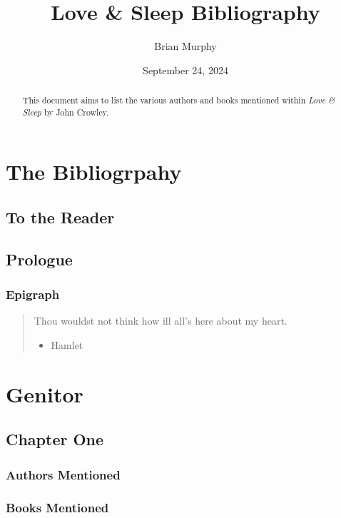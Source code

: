 \documentclass[
  11pt,
]{article}
\title{Love \& Sleep Bibliography}
\author{Brian Murphy}
\date{September 24, 2024}
\providecommand{\tightlist}{%
  \setlength{\itemsep}{0pt}\setlength{\parskip}{0pt}}
\begin{document}
\maketitle
\begin{abstract}
This document aims to list the various authors and books mentioned
within \emph{Love \& Sleep} by John Crowley.
\end{abstract}

\section{The Bibliogrpahy}\label{the-bibliogrpahy}

\subsection{To the Reader}\label{to-the-reader}

\subsection{Prologue}\label{prologue}

\subsubsection{Epigraph}\label{epigraph}

\begin{quote}
Thou wouldst not think how ill all's here about my heart.

\begin{itemize}
\tightlist
\item
  Hamlet
\end{itemize}
\end{quote}

\section{Genitor}\label{genitor}

\subsection{Chapter One}\label{chapter-one}

\subsubsection{Authors Mentioned}\label{authors-mentioned}

\subsubsection{Books Mentioned}\label{books-mentioned}
\end{document}
